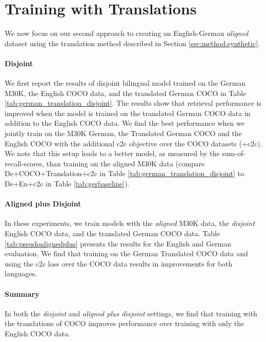 \section{Training with Translations}\label{sec:transaltion}

We now focus on our second approach to creating an 
English-German \textit{aligned} dataset 
using the translation method described in Section \ref{sec:method:synthetic}.

\paragraph{Disjoint}

We first report the results of disjoint bilingual
model trained on the German M30K, the English COCO data, 
and the translated German COCO in Table \ref{tab:german_translation_disjoint}. 
The results show that retrieval performance is improved when the model is trained on the translated German 
COCO data in addition to the English COCO data. 
We find the best performance when we jointly train on the 
M30K German, the Translated German COCO and 
the English COCO with the additional c2c objective 
over the COCO datasets (+c2c). 
We note that this setup leads to a better model, as measured by the sum-of-recall-scores, than training on the aligned M30K data (compare De+COCO+Translation+c2c in Table \ref{tab:german_translation_disjoint} to De+En+c2c in Table \ref{tab:gerbaseline}).

\paragraph{Aligned plus Disjoint}

In these experiments, we train models with the {\it aligned} M30K  
data, the {\it disjoint} English COCO data, and the translated German COCO data. 
Table \ref{tab:pseudoalignedplus} 
presents the results for the English and German evaluation. 
We find that training on the German Translated COCO data and 
using the c2c loss over the COCO data results in improvements for both languages. 


\paragraph{Summary}

In both the \emph{disjoint} and 
\emph{aligned plus disjoint} settings, we find that training 
with the translations of COCO improves 
performance over training with only the English COCO data. 

